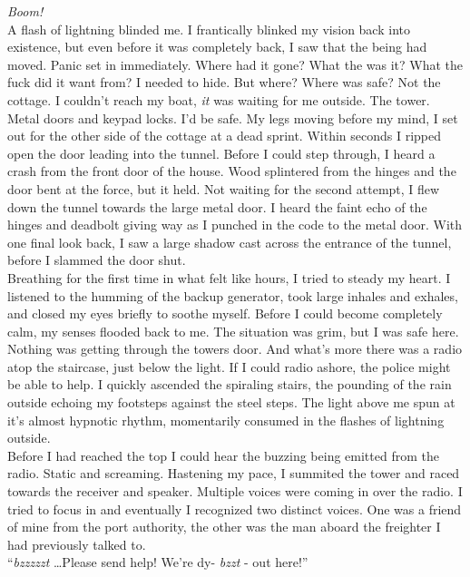 \documentclass[a5paper]{scrartcl}
\begin{document}
\textit{Boom!}
\\


A flash of lightning blinded me. I frantically blinked my vision back into existence, but even before it was completely back, I saw that the being had moved. Panic set in immediately. Where had it gone? What the was it? What the fuck did it want from? I needed to hide. But where? Where was safe? Not the cottage. I couldn't reach my boat, \textit{it}
 was waiting for me outside. The tower. Metal doors and keypad locks. I'd be safe.
My legs moving before my mind, I set out for the other side of the cottage at a dead sprint. Within seconds I ripped open the door leading into the tunnel. Before I could step through, I heard a crash from the front door of the house. Wood splintered from the hinges and the door bent at the force, but it held. Not waiting for the second attempt, I flew down the tunnel towards the large metal door. I heard the faint echo of the hinges and deadbolt giving way as I punched in the code to the metal door. With one final look back, I saw a large shadow cast across the entrance of the tunnel, before I slammed the door shut.\\


Breathing for the first time in what felt like hours, I tried to steady my heart. I listened to the humming of the backup generator, took large inhales and exhales, and closed my eyes briefly to soothe myself. Before I could become completely calm, my senses flooded back to me. The situation was grim, but I was safe here. Nothing was getting through the towers door. And what's more there was a radio atop the staircase, just below the light. If I could radio ashore, the police might be able to help. I quickly ascended the spiraling stairs, the pounding of the rain outside echoing my footsteps against the steel steps. The light above me spun at it's almost hypnotic rhythm, momentarily consumed in the flashes of lightning outside.\\


Before I had reached the top I could hear the buzzing being emitted from the radio. Static and screaming. Hastening my pace, I summited the tower and raced towards the receiver and speaker. Multiple voices were coming in over the radio. I tried to focus in and eventually  I recognized two distinct voices. One was a friend of mine from the port authority, the other was the man aboard the freighter I had previously talked to.\\


\enquote{\textit{bzzzzzt}
\dots  Please send help! We're dy- \textit{bzzt}
 - out here!}\\
\end{document}
